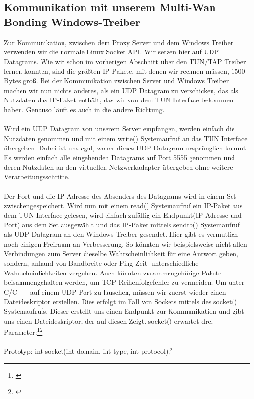 \subsection{Kommunikation mit unserem Multi-Wan Bonding Windows-Treiber}
Zur Kommunikation, zwischen dem Proxy Server und dem Windows Treiber verwenden wir die normale Linux Socket API. Wir setzen hier auf UDP Datagrams. Wie wir schon im vorherigen Abschnitt über den TUN/TAP Treiber lernen konnten, sind die größten IP-Pakete, mit denen wir rechnen müssen, 1500 Bytes groß. Bei der Kommunikation zwischen Server und Windows Treiber machen wir nun nichts anderes, als ein UDP Datagram zu verschicken, das als Nutzdaten das IP-Paket enthält, das wir von dem TUN Interface bekommen haben. Genauso läuft es auch in die andere Richtung. 
\\\\
Wird ein UDP Datagram von unserem Server empfangen, werden einfach die Nutzdaten genommen und mit einem write() Systemaufruf an das TUN Interface übergeben. Dabei ist uns egal, woher dieses UDP Datagram ursprünglich kommt. Es werden einfach alle eingehenden Datagrams auf Port 5555 genommen und deren Nutzdaten an den virtuellen Netzwerkadapter übergeben ohne weitere Verarbeitungsschritte. 
\\\\
Der Port und die IP-Adresse des Absenders des Datagrams wird in einem Set zwischengespeichert. Wird nun mit einem read() Systemaufruf ein IP-Paket aus dem TUN Interface gelesen, wird einfach zufällig ein Endpunkt(IP-Adresse und Port) aus dem Set ausgewählt und das IP-Paket mittels sendto() Systemaufruf als UDP Datagram an den Windows Treiber gesendet. Hier gibt es vermutlich noch einigen Freiraum an Verbesserung. So könnten wir beispielsweise nicht allen Verbindungen zum Server dieselbe Wahrscheinlichkeit für eine Antwort geben, sondern, anhand von Bandbreite oder Ping Zeit, unterschiedliche Wahrscheinlichkeiten vergeben. Auch könnten zusammengehörige Pakete beisammengehalten werden, um TCP Reihenfolgefehler zu vermeiden.
\newpage
\noindent
Um unter C/C++ auf einem UDP Port zu lauschen, müssen wir zuerst wieder einen Dateideskriptor erstellen. Dies erfolgt im Fall von Sockets mittels des socket() Systemaufrufs. Dieser erstellt uns einen Endpunkt zur Kommunikation und gibt uns einen Dateideskriptor, der auf diesen Zeigt. socket() erwartet drei Parameter:\footnote[1]{\cite[Vgl.][]{SRV14}}\footnote[2]{\cite[Vgl.][]{SRV15}}
\\\\
Prototyp: int socket(int domain, int type, int protocol);$^{2}$

